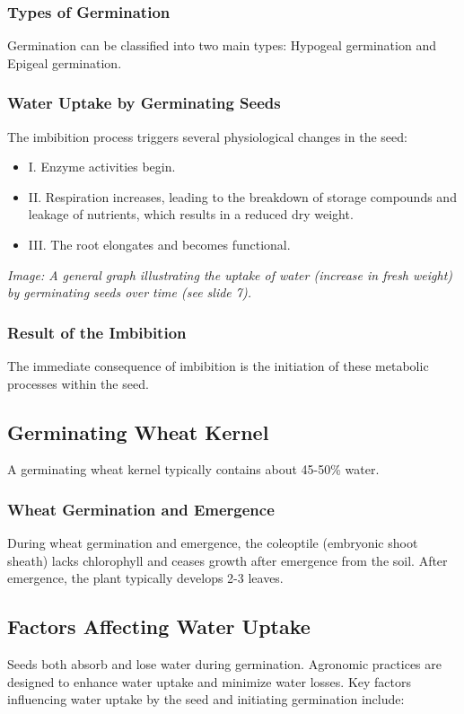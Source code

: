 \subsubsection{Types of Germination} 
Germination can be classified into two main types: Hypogeal germination and Epigeal germination.

\subsubsection{Water Uptake by Germinating Seeds} 
The imbibition process triggers several physiological changes in the seed: 

\begin{itemize} 
    \item I. Enzyme activities begin. 
    \item II. Respiration increases, leading to the breakdown of storage compounds and leakage of nutrients, which results in a reduced dry weight. 
    \item III. The root elongates and becomes functional. 
\end{itemize} 

\textit{Image: A general graph illustrating the uptake of water (increase in fresh weight) by germinating seeds over time (see slide 7).}

\subsubsection{Result of the Imbibition} 
The immediate consequence of imbibition is the initiation of these metabolic processes within the seed.

\subsection{Germinating Wheat Kernel} 
A germinating wheat kernel typically contains about 45-50\% water.

\subsubsection{Wheat Germination and Emergence} 
During wheat germination and emergence, the coleoptile (embryonic shoot sheath) lacks chlorophyll and ceases growth after emergence from the soil. After emergence, the plant typically develops 2-3 leaves.

\subsection{Factors Affecting Water Uptake} 
Seeds both absorb and lose water during germination. Agronomic practices are designed to enhance water uptake and minimize water losses. Key factors influencing water uptake by the seed and initiating germination include: 


